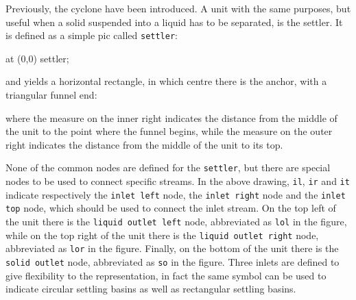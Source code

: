\documentclass[12pt]{article}						%
\newcommand*{\chpn}[1]{\texttt{#1}}				%
\newcommand*{\chpp}[1]{\texttt{#1}}				%
\begin{document}
Previously, the cyclone have been introduced. A unit with the same purposes, but
useful when a solid suspended into a liquid has to be separated, is the settler.
It is defined as a simple pic called \chpp{settler}:
\begin{chpcode}
	\pic at (0,0) {settler};
\end{chpcode}
and yields a horizontal rectangle, in which centre there is the anchor, with a
triangular funnel end:
\begin{center}
\end{center}
where the measure on the inner right indicates the distance from the middle of
the unit to the point where the funnel begins, while the measure on the outer
right indicates the distance from the middle of the unit to its top.

None of the common nodes are defined for the \chpp{settler}, but there are
special nodes to be used to connect specific streams. In the above drawing,
\chpn{il}, \chpn{ir} and \chpn{it} indicate respectively the
\chpn{inlet left} node, the \chpn{inlet right} node and the \chpn{inlet top}
node, which should be used to connect the inlet stream. On the top left of
the unit there is the \chpn{liquid outlet left} node, abbreviated as \chpn{lol}
in the figure, while on the top right of the unit there is the
\chpn{liquid outlet right} node, abbreviated as \chpn{lor} in the figure.
Finally, on the bottom of the unit there is the \chpn{solid outlet} node,
abbreviated as \chpn{so} in the figure. Three inlets are defined to give
flexibility to the representation, in fact the same symbol can be used to
indicate circular settling basins as well as rectangular settling basins.
\end{document}
